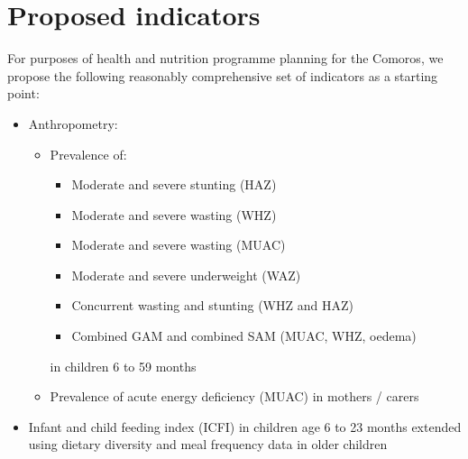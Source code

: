 \documentclass[12pt,a4paper]{article}
\begin{document}
\hypertarget{proposed-indicators}{%
\section{Proposed indicators}\label{proposed-indicators}}

For purposes of health and nutrition programme planning for the Comoros, we propose the following reasonably comprehensive set of indicators as a starting point:

\begin{itemize}
\item
  Anthropometry:

  \begin{itemize}
  \item
    Prevalence of:

    \begin{itemize}
    \item
      Moderate and severe stunting (HAZ)
    \item
      Moderate and severe wasting (WHZ)
    \item
      Moderate and severe wasting (MUAC)
    \item
      Moderate and severe underweight (WAZ)
    \item
      Concurrent wasting and stunting (WHZ and HAZ)
    \item
      Combined GAM and combined SAM (MUAC, WHZ, oedema)
    \end{itemize}

    in children 6 to 59 months
  \item
    Prevalence of acute energy deficiency (MUAC) in mothers / carers
  \end{itemize}
\item
  Infant and child feeding index (ICFI) in children age 6 to 23 months extended using dietary diversity and meal frequency data in older children


\end{itemize}
\end{document}
